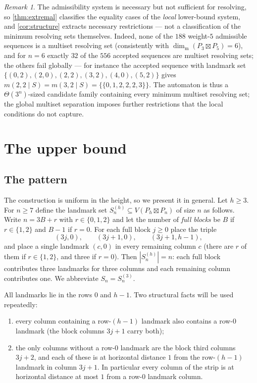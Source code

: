 \documentclass[11pt]{amsart}
\theoremstyle{remark}
\newtheorem{remark}[remark]{Remark}
\newcommand{\mdim}{\operatorname{dim}_{\mathrm m}}
\newcommand{\ms}[1]{\mathopen{\{\!\{}#1\mathclose{\}\!\}}}
\begin{document}
\begin{remark}\label{rem:necessity}
The admissibility system is necessary but not sufficient for resolving, so \cref{thm:extremal} classifies the equality cases of the \emph{local} lower-bound system, and \cref{cor:structure} extracts necessary restrictions --- not a classification of the minimum resolving sets themselves.  Indeed, none of the $188$ weight-$5$ admissible sequences is a multiset resolving set (consistently with $\mdim(P_3\boxtimes P_5)=6$), and for $n=6$ exactly $32$ of the $556$ accepted sequences are multiset resolving sets; the others fail globally --- for instance the accepted sequence with landmark set $\{(0,2),(2,0),(2,2),(3,2),(4,0),(5,2)\}$ gives $m(2,2\mid S)=m(3,2\mid S)=\ms{0,1,2,2,2,3}$.  The automaton is thus a $\Theta(3^n)$-sized candidate family containing every minimum multiset resolving set; the global multiset separation imposes further restrictions that the local conditions do not capture.
\end{remark}

\section{The upper bound}\label{sec:upper}

\subsection{The pattern}
The construction is uniform in the height, so we present it in general.  Let $h\ge 3$.  For $n\ge 7$ define the landmark set $S^{(h)}_n\subseteq V(P_h\boxtimes P_n)$ of size $n$ as follows.  Write $n=3B+r$ with $r\in\{0,1,2\}$ and let the number of \emph{full blocks} be $B$ if $r\in\{1,2\}$ and $B-1$ if $r=0$.  For each full block $j\ge 0$ place the triple
\[
 (3j,0),\qquad (3j+1,0),\qquad (3j+1,h-1),
\]
and place a single landmark $(c,0)$ in every remaining column $c$ (there are $r$ of them if $r\in\{1,2\}$, and three if $r=0$).  Then $|S^{(h)}_n|=n$: each full block contributes three landmarks for three columns and each remaining column contributes one.  We abbreviate $S_n=S^{(3)}_n$.

All landmarks lie in the rows $0$ and $h-1$.  Two structural facts will be used repeatedly:
\begin{enumerate}[label=(\roman*),leftmargin=2.5em]
\item\label{it:dom} every column containing a row-$(h-1)$ landmark also contains a row-$0$ landmark (the block columns $3j+1$ carry both);
\item\label{it:gap} the only columns without a row-$0$ landmark are the block third columns $3j+2$, and each of these is at horizontal distance $1$ from the row-$(h-1)$ landmark in column $3j+1$.  In particular every column of the strip is at horizontal distance at most $1$ from a row-$0$ landmark column.
\end{enumerate}
\end{document}
